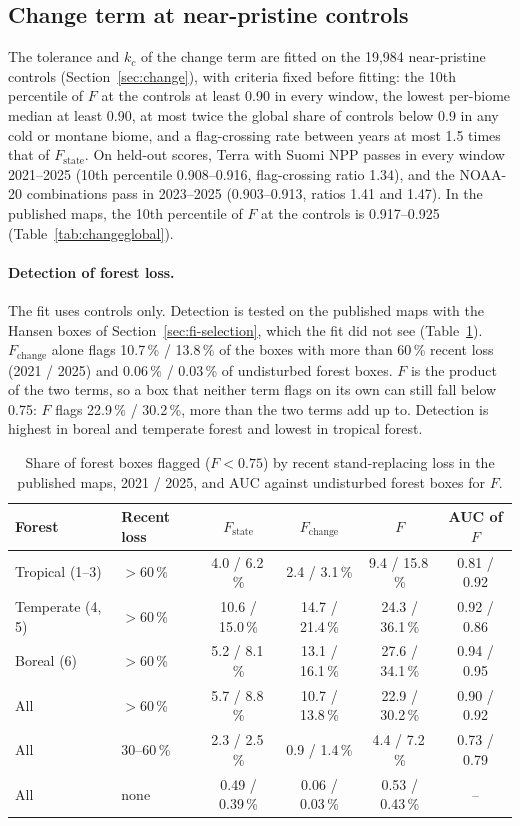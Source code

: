 \documentclass[11pt,a4paper]{article}
\begin{document}
\subsection{Change term at near-pristine controls}
\label{sec:change-validation}

The tolerance and $k_c$ of the change term are fitted on the 19,984 near-pristine controls
(Section~\ref{sec:change}), with criteria fixed before fitting: the 10th percentile of $F$ at the
controls at least 0.90 in every window, the lowest per-biome median at least 0.90, at most twice
the global share of controls below 0.9 in any cold or montane biome, and a flag-crossing rate
between years at most 1.5 times that of $F_{\text{state}}$. On held-out scores, Terra with Suomi
NPP passes in every window 2021--2025 (10th percentile 0.908--0.916, flag-crossing ratio 1.34),
and the NOAA-20 combinations pass in 2023--2025 (0.903--0.913, ratios 1.41 and 1.47). In the
published maps, the 10th percentile of $F$ at the controls is 0.917--0.925
(Table~\ref{tab:changeglobal}).

\paragraph{Detection of forest loss.} The fit uses controls only. Detection is tested on the
published maps with the Hansen boxes of Section~\ref{sec:fi-selection}, which the fit did not see
(Table~\ref{tab:change-hansen}). $F_{\text{change}}$ alone flags 10.7\,\% / 13.8\,\% of the
boxes with more than 60\,\% recent loss (2021 / 2025) and 0.06\,\% / 0.03\,\% of undisturbed
forest boxes. $F$ is the product of the two terms, so a box that neither term flags on its own
can still fall below 0.75: $F$ flags 22.9\,\% / 30.2\,\%, more than the two terms add up to.
Detection is highest in boreal and temperate forest and lowest in tropical forest.

\begin{table}[H]
\centering\small
\caption{Share of forest boxes flagged ($F < 0.75$) by recent stand-replacing loss in the
published maps, 2021 / 2025, and AUC against undisturbed forest boxes for $F$.}
\label{tab:change-hansen}
\setlength{\tabcolsep}{4pt}
\begin{tabular}{llcccc}
\toprule
Forest & Recent loss & $F_{\text{state}}$ & $F_{\text{change}}$ & $F$ & AUC of $F$ \\
\midrule
Tropical (1--3) & $>60\,\%$ & 4.0 / 6.2\,\% & 2.4 / 3.1\,\% & 9.4 / 15.8\,\% & 0.81 / 0.92 \\
Temperate (4, 5) & $>60\,\%$ & 10.6 / 15.0\,\% & 14.7 / 21.4\,\% & 24.3 / 36.1\,\% & 0.92 / 0.86 \\
Boreal (6) & $>60\,\%$ & 5.2 / 8.1\,\% & 13.1 / 16.1\,\% & 27.6 / 34.1\,\% & 0.94 / 0.95 \\
All & $>60\,\%$ & 5.7 / 8.8\,\% & 10.7 / 13.8\,\% & 22.9 / 30.2\,\% & 0.90 / 0.92 \\
All & 30--60\,\% & 2.3 / 2.5\,\% & 0.9 / 1.4\,\% & 4.4 / 7.2\,\% & 0.73 / 0.79 \\
All & none & 0.49 / 0.39\,\% & 0.06 / 0.03\,\% & 0.53 / 0.43\,\% & -- \\
\bottomrule
\end{tabular}
\end{table}
\end{document}
